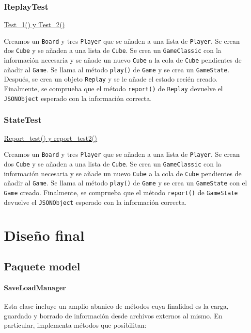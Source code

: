 \documentclass[../DocumentoOficial.tex]{subfiles}
\begin{document}
\subsection{ReplayTest}
\underline{Test\_1() y Test\_2()}

Creamos un \texttt{Board} y tres \texttt{Player} que se añaden a una lista de \texttt{Player}. Se crean dos \texttt{Cube} y se añaden a una lista de \texttt{Cube}. Se crea un \texttt{GameClassic} con la información necesaria y se añade un nuevo \texttt{Cube} a la cola de \texttt{Cube} pendientes de añadir al \texttt{Game}. Se llama al método \texttt{play()} de \texttt{Game} y se crea un \texttt{GameState}. Después, se crea un objeto \texttt{Replay} y se le añade el estado recién creado. Finalmente, se comprueba que el método \texttt{report()} de \texttt{Replay} devuelve el \texttt{JSONObject} esperado con la información correcta.

\subsection{StateTest}
\underline{Report\_test() y report\_test2()}

Creamos un \texttt{Board} y tres \texttt{Player} que se añaden a una lista de \texttt{Player}. Se crean dos \texttt{Cube} y se añaden a una lista de \texttt{Cube}. Se crea un \texttt{GameClassic} con la información necesaria y se añade un nuevo \texttt{Cube} a la cola de \texttt{Cube} pendientes de añadir al \texttt{Game}. Se llama al método \texttt{play()} de \texttt{Game} y se crea un \texttt{GameState} con el \texttt{Game} creado. Finalmente, se comprueba que el método \texttt{report()} de \texttt{GameState} devuelve el \texttt{JSONObject} esperado con la información correcta.


\chapter{Diseño final}
\label{ch:DisenyoFinal}

\section{Paquete model}

\subsubsection{SaveLoadManager}

Esta clase incluye un amplio abanico de métodos cuya finalidad es la carga, guardado y borrado de información desde archivos externos al mismo. En particular, implementa métodos que posibilitan:
\end{document}
